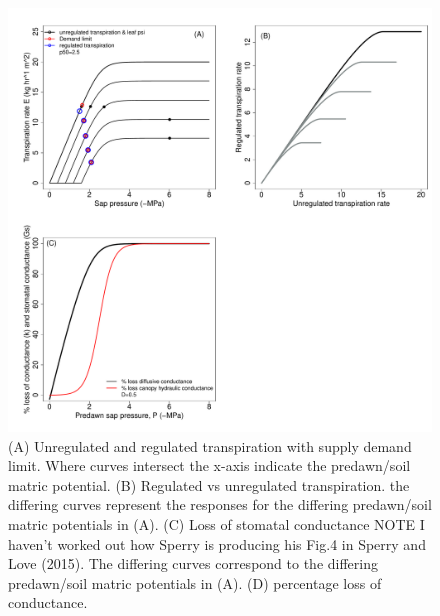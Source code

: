 \documentclass[a4paper]{article}\usepackage[]{graphicx}\usepackage[]{color}
\makeatletter
\def\maxwidth{ %
  \ifdim\Gin@nat@width>\linewidth
    \linewidth
  \else
    \Gin@nat@width
  \fi
}
\newenvironment{knitrout}{}{} %
\makeatother
\begin{document}
\begin{centering}
\begin{knitrout}
\color{fgcolor}\begin{figure}
\includegraphics[width=\maxwidth]{figure/unnamed-chunk-10-1} \caption{\label{fig:figs}(A) Unregulated and regulated transpiration with supply demand limit. Where curves intersect the x-axis indicate the predawn/soil matric potential. (B) Regulated vs unregulated transpiration. the differing curves represent the responses for the differing predawn/soil matric potentials in (A). (C) Loss of stomatal conductance NOTE I haven't worked out how Sperry is producing his Fig.4 in Sperry and Love (2015). The differing curves correspond to the differing predawn/soil matric potentials in (A). (D) percentage loss of conductance.}\label{fig:unnamed-chunk-10}
\end{figure}


\end{knitrout}
\end{centering}





\end{document}
